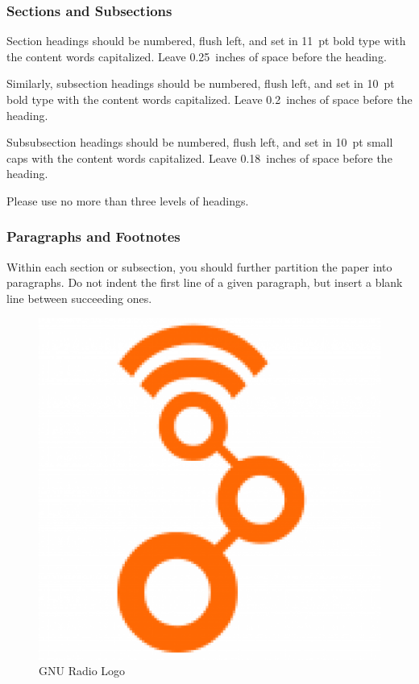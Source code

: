 \documentclass{article}
\begin{document}
\subsubsection{Sections and Subsections}

Section headings should be numbered, flush left, and set in 11~pt bold
type with the content words capitalized. Leave 0.25~inches of space
before the heading.

Similarly, subsection headings should be numbered, flush left, and set
in 10~pt bold type with the content words capitalized. Leave
0.2~inches of space before the heading.

Subsubsection headings should be numbered, flush left, and
set in 10~pt small caps with the content words capitalized. Leave
0.18~inches of space before the heading.

Please use no more than three levels of headings.

\subsubsection{Paragraphs and Footnotes}

Within each section or subsection, you should further partition the
paper into paragraphs. Do not indent the first line of a given
paragraph, but insert a blank line between succeeding ones.

\begin{figure}[ht]
  \begin{center}
    \centerline{\includegraphics[width=\columnwidth]{gr.png}}
    \caption{GNU Radio Logo}
    \label{grlogo}
  \end{center}
\end{figure} 
\end{document}
